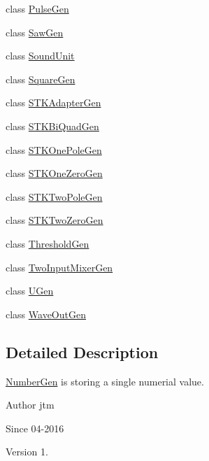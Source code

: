 \begin{DoxyCompactItemize}
class \hyperlink{classunit_1_1PulseGen}{Pulse\-Gen}
\item 
class \hyperlink{classunit_1_1SawGen}{Saw\-Gen}
\item 
class \hyperlink{classunit_1_1SoundUnit}{Sound\-Unit}
\item 
class \hyperlink{classunit_1_1SquareGen}{Square\-Gen}
\item 
class \hyperlink{classunit_1_1STKAdapterGen}{S\-T\-K\-Adapter\-Gen}
\item 
class \hyperlink{classunit_1_1STKBiQuadGen}{S\-T\-K\-Bi\-Quad\-Gen}
\item 
class \hyperlink{classunit_1_1STKOnePoleGen}{S\-T\-K\-One\-Pole\-Gen}
\item 
class \hyperlink{classunit_1_1STKOneZeroGen}{S\-T\-K\-One\-Zero\-Gen}
\item 
class \hyperlink{classunit_1_1STKTwoPoleGen}{S\-T\-K\-Two\-Pole\-Gen}
\item 
class \hyperlink{classunit_1_1STKTwoZeroGen}{S\-T\-K\-Two\-Zero\-Gen}
\item 
class \hyperlink{classunit_1_1ThresholdGen}{Threshold\-Gen}
\item 
class \hyperlink{classunit_1_1TwoInputMixerGen}{Two\-Input\-Mixer\-Gen}
\item 
class \hyperlink{classunit_1_1UGen}{U\-Gen}
\item 
class \hyperlink{classunit_1_1WaveOutGen}{Wave\-Out\-Gen}
\end{DoxyCompactItemize}


\subsection{Detailed Description}
\hyperlink{classunit_1_1NumberGen}{Number\-Gen} is storing a single numerial value.

\begin{DoxyAuthor}{Author}
jtm 
\end{DoxyAuthor}
\begin{DoxySince}{Since}
04-\/2016 
\end{DoxySince}
\begin{DoxyVersion}{Version}
1. 
\end{DoxyVersion}
